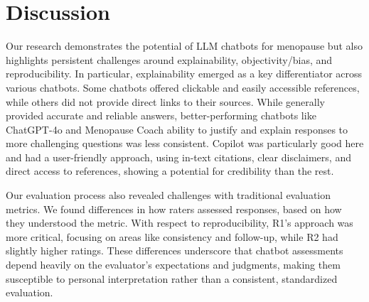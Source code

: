 \section{Discussion}
Our research demonstrates the potential of LLM chatbots for menopause but also highlights persistent challenges around explainability, objectivity/bias, and reproducibility.
In particular, explainability emerged
as a key differentiator across various chatbots. Some chatbots offered clickable and easily accessible references, while others did not provide direct links to their sources. While generally provided accurate and reliable answers, better-performing chatbots like ChatGPT-4o and Menopause Coach ability to justify and explain responses to more challenging questions was less consistent.
Copilot was particularly good here and had a user-friendly approach, using in-text citations, clear disclaimers, and direct access to references, showing a potential for credibility than the rest.

Our evaluation process also revealed challenges with traditional evaluation metrics. We found differences in how raters assessed responses, based on how they understood the metric. With respect to reproducibility, R1's approach was more critical, focusing on areas like consistency and follow-up, while R2 had slightly higher ratings. These differences underscore that chatbot assessments depend heavily on the evaluator's expectations and judgments, making them susceptible to personal interpretation rather than a consistent, standardized evaluation.